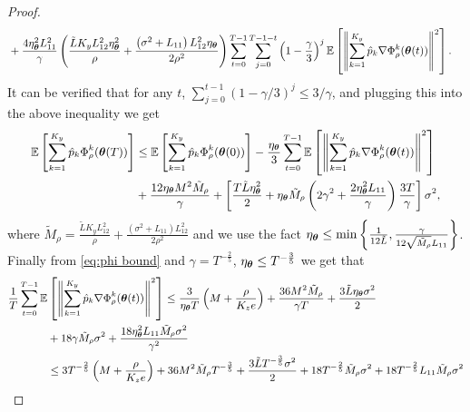 \begin{proof}
\begin{equation}
\begin{aligned}
			& + \frac{4\eta_{\text{\boldmath{$\theta$}}}^{2}L_{11}^{2}}{\gamma}\left(\frac{\tilde{L}K_{y}L_{12}^{2}\eta_{\text{\boldmath{$\theta$}}}^{2}}{\rho} + \frac{\left(\sigma^{2} + L_{11}\right)L_{12}^{2}\eta_{\text{\boldmath{$\theta$}}}}{2\rho^{2}}\right)\sum\limits_{t=0}^{T- 1}\sum\limits_{j=0}^{T - 1 - t}\left(1 - \frac{\gamma}{3}\right)^{j}\mathbb{E}\left[\left\|\sum\limits_{k = 1}^{K_{y}}\hat{p}_{k}\nabla\Phi_{\rho}^{k}(\text{\boldmath{$\theta$}}(t))\right\|^{2}\right]. 
		\end{aligned}
	\end{equation}
	It can be verified that for any $t$, $\sum_{j=0}^{t - 1}\left(1 - \gamma / 3\right)^{j} \leq 3/\gamma$, and plugging this into the above inequality we get 
	\begin{equation}
		\small
		\begin{aligned}
			\mE\left[\sum\limits_{k=1}^{K_{y}}\hat{p}_{k}\Phi_{\rho}^{k}(\btheta(T))\right] & \leq \mE\left[\sum\limits_{k=1}^{K_{y}}\hat{p}_{k}\Phi_{\rho}^{k}(\btheta(0))\right] - \frac{\eta_{\btheta}}{3}\sum\limits_{t=0}^{T - 1}\mE\left[\left\|\sum\limits_{k=1}^{K_{y}}\hat{p}_{k}\nabla\Phi_{\rho}^{k}(\btheta(t))\right\|^{2}\right] \\
			& + \frac{12\eta_{\btheta}M^{2}\tilde{M}_{\rho}}{\gamma} + \left[\frac{T\tilde{L}\eta_{\btheta}^{2}}{2} + \eta_{\btheta}\tilde{M}_{\rho}\left(2\gamma^{2} + \frac{2\eta_{\btheta}^{2}L_{11}}{\gamma}\right)\frac{3T}{\gamma}\right]\sigma^{2}, 
		\end{aligned}
	\end{equation}
	where $\tilde{M}_{\rho}=\frac{\tilde{L}K_{y}L_{12}^{2}}{\rho} + \frac{\left(\sigma^{2} + L_{11}\right)L_{12}^{2}}{2\rho^{2}}$ and we use the fact $\eta_{\text{\boldmath{$\theta$}}} \leq \min\left\{\frac{1}{12\tilde{L}}, \frac{\gamma}{12\sqrt{\tilde{M}_{\rho}}L_{11}}\right\}$. Finally from \eqref{eq:phi bound} and $\gamma = T^{-\frac{2}{5}}$, $\eta_{\text{\boldmath{$\theta$}}} \leq T^{-\frac{3}{5}}$ we get that
	\begin{equation}
		\small
		\begin{aligned}
			\frac{1}{T}\sum\limits_{t=0}^{T - 1}\mE & \left[\left\|\sum\limits_{k=1}^{K_{y}}\hat{p}_{k}\nabla\Phi_{\rho}^{k}(\btheta(t))\right\|^{2}\right] \leq \frac{3}{\eta_{\btheta}T}\left(M + \frac{\rho}{K_{z}e}\right) + \frac{36M^{2}\tilde{M}_{\rho}}{\gamma T} +  \frac{3\tilde{L}\eta_{\btheta}\sigma^{2}}{2} \\
			& + 18\gamma\tilde{M}_{\rho}\sigma^{2} + \frac{18\eta_{\btheta}^{2}L_{11}\tilde{M}_{\rho}\sigma^{2}}{\gamma^{2}} \\
			& \leq 3T^{-\frac{2}{5}}\left(M + \frac{\rho}{K_{z}e}\right) + 36M^{2}\tilde{M}_{\rho}T^{-\frac{3}{5}} + \frac{3\tilde{L}T^{-\frac{3}{5}}\sigma^{2}}{2} + 18T^{-\frac{2}{5}}\tilde{M}_{\rho}\sigma^{2} + 18T^{-\frac{2}{5}}L_{11}\tilde{M}_{\rho}\sigma^{2} \\

\end{aligned}
\end{equation}
\end{proof}
